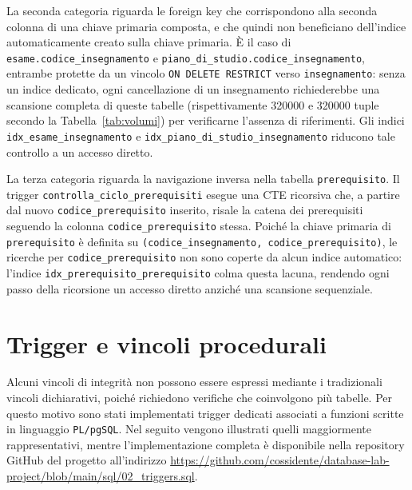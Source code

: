 La seconda categoria riguarda le foreign key che corrispondono alla seconda colonna di una chiave primaria composta, e che quindi non beneficiano dell'indice automaticamente creato sulla chiave primaria. È il caso di \texttt{e\-sa\-me\-.co\-di\-ce\_in\-seg\-na\-men\-to} e \texttt{pia\-no\_di\_stu\-dio\-.co\-di\-ce\_in\-seg\-na\-men\-to}, entrambe protette da un vincolo \texttt{ON~DELETE~RESTRICT} verso \texttt{in\-seg\-na\-men\-to}: senza un indice dedicato, ogni cancellazione di un insegnamento richiederebbe una scansione completa di queste tabelle (rispettivamente \num{320000} e \num{320000} tuple secondo la Tabella~\ref{tab:volumi}) per verificarne l'assenza di riferimenti. Gli indici \texttt{idx\_e\-sa\-me\_in\-seg\-na\-men\-to} e \texttt{idx\_pia\-no\_di\_stu\-dio\_in\-seg\-na\-men\-to} riducono tale controllo a un accesso diretto.

La terza categoria riguarda la navigazione inversa nella tabella \texttt{pre\-re\-qui\-si\-to}. Il trigger \texttt{con\-trol\-la\_ci\-clo\_pre\-re\-qui\-si\-ti} esegue una CTE ricorsiva che, a partire dal nuovo \texttt{co\-di\-ce\_pre\-re\-qui\-si\-to} inserito, risale la catena dei prerequisiti seguendo la colonna \texttt{co\-di\-ce\_pre\-re\-qui\-si\-to} stessa. Poiché la chiave primaria di \texttt{pre\-re\-qui\-si\-to} è definita su \texttt{(co\-di\-ce\_in\-seg\-na\-men\-to,\allowbreak\ co\-di\-ce\_pre\-re\-qui\-si\-to)}, le ricerche per \texttt{co\-di\-ce\_pre\-re\-qui\-si\-to} non sono coperte da alcun indice automatico: l'indice \texttt{idx\_pre\-re\-qui\-si\-to\_pre\-re\-qui\-si\-to} colma questa lacuna, rendendo ogni passo della ricorsione un accesso diretto anziché una scansione sequenziale.

\section{Trigger e vincoli procedurali}
\label{sec:trigger-e-vincoli-procedurali}

Alcuni vincoli di integrità non possono essere espressi mediante i tradizionali vincoli dichiarativi, poiché richiedono verifiche che coinvolgono più tabelle. Per questo motivo sono stati implementati trigger dedicati associati a funzioni scritte in linguaggio \texttt{PL/pgSQL}. Nel seguito vengono illustrati quelli maggiormente rappresentativi, mentre l'implementazione completa è disponibile nella repository GitHub del progetto all'indirizzo \url{https://github.com/cossidente/database-lab-project/blob/main/sql/02_triggers.sql}.

